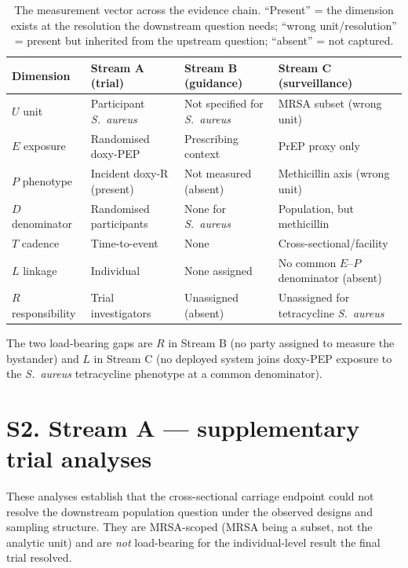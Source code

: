 \documentclass[11pt,a4paper]{article}
\newcommand{\sa}{\emph{S.~aureus}}
\begin{document}
\begin{table}[h]
\centering
\caption{The measurement vector across the evidence chain. ``Present'' = the
dimension exists at the resolution the downstream question needs; ``wrong
unit/resolution'' = present but inherited from the upstream question; ``absent''
= not captured.}
\label{tab:vector}
\small
\begin{tabularx}{\textwidth}{@{}lXXX@{}}
\toprule
Dimension & Stream A (trial) & Stream B (guidance) & Stream C (surveillance)\\
\midrule
$U$ unit & Participant \sa{} & Not specified for \sa{} & MRSA subset (wrong unit)\\
$E$ exposure & Randomised doxy-PEP & Prescribing context & PrEP proxy only\\
$P$ phenotype & Incident doxy-R (present) & Not measured (absent) & Methicillin axis (wrong unit)\\
$D$ denominator & Randomised participants & None for \sa{} & Population, but methicillin\\
$T$ cadence & Time-to-event & None & Cross-sectional/facility\\
$L$ linkage & Individual & None assigned & No common $E$--$P$ denominator (absent)\\
$R$ responsibility & Trial investigators & Unassigned (absent) & Unassigned for tetracycline \sa{}\\
\bottomrule
\end{tabularx}
\end{table}

The two load-bearing gaps are $R$ in Stream B (no party assigned to measure the
bystander) and $L$ in Stream C (no deployed system joins doxy-PEP exposure to the
\sa{} tetracycline phenotype at a common denominator).

\section*{S2. Stream A --- supplementary trial analyses}

These analyses establish that the cross-sectional carriage endpoint could not
resolve the downstream population question under the observed designs and sampling
structure. They are MRSA-scoped (MRSA being a subset, not the analytic unit) and
are \emph{not} load-bearing for the individual-level result the final trial
resolved.
\end{document}
